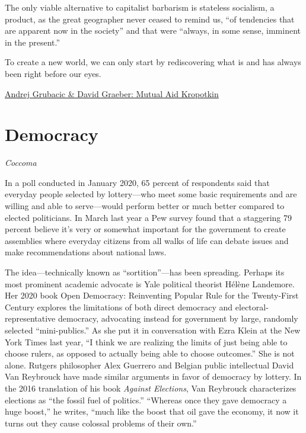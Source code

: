 \documentclass[
]{book}
\begin{document}
The only viable alternative to capitalist barbarism is stateless socialism, a product, as the great geographer never ceased to remind us, ``of tendencies that are apparent now in the society'' and that were ``always, in some sense, imminent in the present.''

To create a new world, we can only start by rediscovering what is and has always been right before our eyes.

\href{https://theanarchistlibrary.org/library/andrej-grubacic-david-graeber-introduction-to-mutual-aid}{Andrej Grubacic \& David Graeber: Mutual Aid Kropotkin}

\hypertarget{democracy}{%
\chapter{Democracy}\label{democracy}}

\emph{Coccoma}

In a poll conducted in January 2020, 65 percent of respondents said that everyday people selected by lottery---who meet some basic requirements and are willing and able to serve---would perform better or much better compared to elected politicians. In March last year a Pew survey found that a staggering 79 percent believe it's very or somewhat important for the government to create assemblies where everyday citizens from all walks of life can debate issues and make recommendations about national laws.

The idea---technically known as ``sortition''---has been spreading. Perhaps its most prominent academic advocate is Yale political theorist Hélène Landemore. Her 2020 book Open Democracy: Reinventing Popular Rule for the Twenty-First Century explores the limitations of both direct democracy and electoral-representative democracy, advocating instead for government by large, randomly selected ``mini-publics.'' As she put it in conversation with Ezra Klein at the New York Times last year, ``I think we are realizing the limits of just being able to choose rulers, as opposed to actually being able to choose outcomes.'' She is not alone. Rutgers philosopher Alex Guerrero and Belgian public intellectual David Van Reybrouck have made similar arguments in favor of democracy by lottery. In the 2016 translation of his book \emph{Against Elections}, Van Reybrouck characterizes elections as ``the fossil fuel of politics.'' ``Whereas once they gave democracy a huge boost,'' he writes, ``much like the boost that oil gave the economy, it now it turns out they cause colossal problems of their own.''
\end{document}
